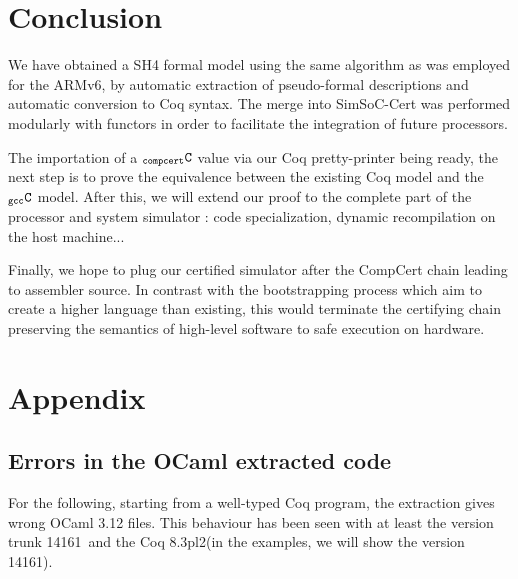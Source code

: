 \documentclass[a4paper, 11pt]{article}
\newcommand{\ocaml}{OCaml 3.12\xspace}
\newcommand{\coqc}{Coq 8.3pl2\xspace}
\newcommand{\coqv}{14161}
\newcommand{\C}{$_{\tt compcert}{\tt C}$\xspace}
\newcommand{\gccC}{$_{\tt gcc}{\tt C}$\xspace}
\newcommand{\SScert}{SimSoC-Cert\xspace}
\begin{document}
\section{Conclusion}
\label{s:concl}

We have obtained a SH4 formal model using the same algorithm as was employed for the ARMv6, by automatic extraction of pseudo-formal descriptions and automatic conversion to Coq syntax. The merge into \SScert was performed modularly with functors in order to facilitate the integration of future processors.

The importation of a \C value via our Coq pretty-printer being ready, the next step is to prove the equivalence between the existing Coq model and the \gccC model. After this, we will extend our proof to the complete part of the processor and system simulator : code specialization, dynamic recompilation on the host machine...

Finally, we hope to plug our certified simulator after the CompCert chain leading to assembler source. In contrast with the bootstrapping process which aim to create a higher language than existing, this would terminate the certifying chain preserving the semantics of high-level software to safe execution on hardware.




\newpage
\appendix
\section{Appendix}
\subsection{Errors in the OCaml extracted code}
For the following, starting from a well-typed Coq program, the extraction gives wrong \ocaml files. This behaviour has been seen with at least the version trunk \coqv~and the \coqc (in the examples, we will show the version \coqv).
\end{document}

